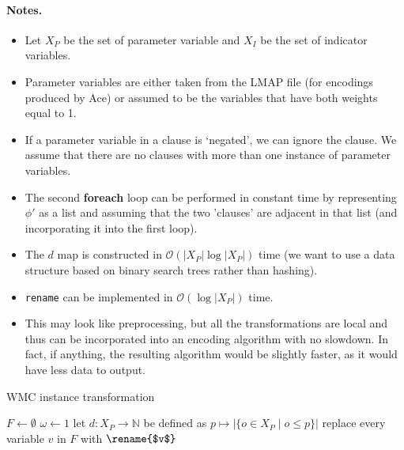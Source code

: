 \documentclass[runningheads]{llncs}
\begin{document}
\paragraph{Notes.}
\begin{itemize}
\item Let $X_P$ be the set of parameter variable and $X_I$ be the set of
  indicator variables.
\item Parameter variables are either taken from the LMAP file (for encodings
  produced by Ace) or assumed to be the variables that have both weights equal
  to 1.
\item If a parameter variable in a clause is `negated', we can ignore the
  clause. We assume that there are no clauses with more than one instance of
  parameter variables.
\item The second \textbf{foreach} loop can be performed in constant time by
  representing $\phi'$ as a list and assuming that the two 'clauses' are
  adjacent in that list (and incorporating it into the first loop).
\item The $d$ map is constructed in $\mathcal{O}(|X_P|\log|X_P|)$ time (we want
  to use a data structure based on binary search trees rather than hashing).
\item \texttt{rename} can be implemented in $\mathcal{O}(\log |X_P|)$ time.
\item This may look like preprocessing, but all the transformations are local
  and thus can be incorporated into an encoding algorithm with no slowdown. In
  fact, if anything, the resulting algorithm would be slightly faster, as it
  would have less data to output.
\end{itemize}

\begin{algorithm}[t]
  \caption{WMC instance transformation}
  \label{alg:transformation}
  $F \gets \emptyset$\;
  $\omega \gets 1$\;
  let $d\colon X_P \to \mathbb{N}$ be defined as $p \mapsto |\{ o \in X_P \mid o
  \le p \}|$\;
  replace every variable $v$ in $F$ with $\rename{$v$}$\;
  \;
\end{algorithm}
\end{document}
